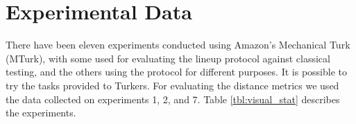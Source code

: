 \documentclass[12]{article}
\begin{document}
\section{Experimental Data} \label{sec:expts}

There have been eleven experiments conducted using Amazon's Mechanical Turk~\citep{turk} (MTurk), with some used for evaluating the lineup protocol against classical testing, and the others using the protocol for different purposes. It is possible to try the tasks provided to Turkers\citep{majumder:2013}. For evaluating the distance metrics we used the data collected on experiments 1, 2, and 7. Table \ref{tbl:visual_stat} describes the experiments.

\end{document}
